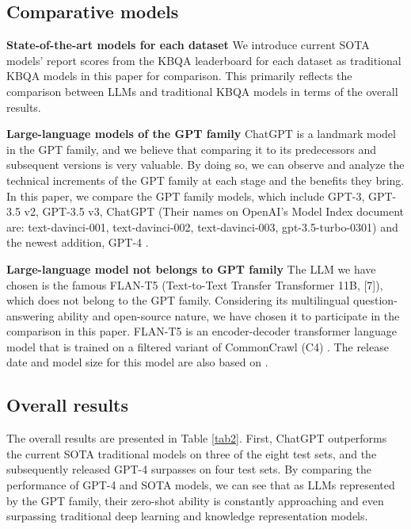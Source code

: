 \documentclass[runningheads]{llncs}
\begin{document}
\subsection{Comparative models}
\textbf{State-of-the-art models for each dataset} 
We introduce current SOTA models’ report scores from the KBQA leaderboard \cite{perevalov2022knowledge} for each dataset as traditional KBQA models in this paper for comparison. This primarily reflects the comparison between LLMs and traditional KBQA models in terms of the overall results.

\textbf{Large-language models of the GPT family} 
ChatGPT is a landmark model in the GPT family, and we believe that comparing it to its predecessors and subsequent versions is very valuable. By doing so, we can observe and analyze the technical increments of the GPT family at each stage and the benefits they bring. In this paper, we compare the GPT family models, which include GPT-3, GPT-3.5 v2, GPT-3.5 v3, ChatGPT (Their names on OpenAI's Model Index document are: text-davinci-001, text-davinci-002, text-davinci-003, gpt-3.5-turbo-0301) and the newest addition, GPT-4 \cite{openai2023gpt4}.

\textbf{Large-language model not belongs to GPT family} 
The LLM we have chosen is the famous FLAN-T5 (Text-to-Text Transfer Transformer 11B, [7]), which does not belong to the GPT family. Considering its multilingual question-answering ability and open-source nature, we have chosen it to participate in the comparison in this paper. FLAN-T5 is an encoder-decoder transformer language model that is trained on a filtered variant of CommonCrawl (C4) \cite{raffel2020exploring}. The release date and model size for this model are also based on \cite{raffel2020exploring}.





\subsection{Overall results}
The overall results are presented in Table \ref{tab2}. First, ChatGPT outperforms the current SOTA traditional models on three of the eight test sets, and the subsequently released GPT-4 surpasses on four test sets. By comparing the performance of GPT-4 and SOTA models, we can see that as LLMs represented by the GPT family, their zero-shot ability is constantly approaching and even surpassing traditional deep learning and knowledge representation models.
\end{document}
